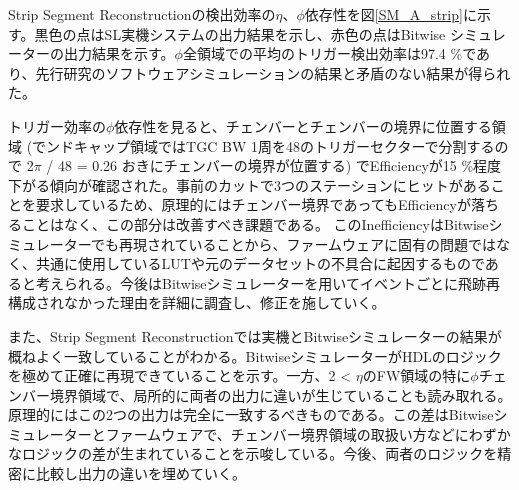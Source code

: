 Strip Segment Reconstructionの検出効率の$\eta$、$\phi$依存性を図\ref{SM_A_strip}に示す。黒色の点はSL実機システムの出力結果を示し、赤色の点はBitwise シミュレーターの出力結果を示す。$\phi$全領域での平均のトリガー検出効率は97.4 \%であり、先行研究のソフトウェアシミュレーションの結果と矛盾のない結果が得られた。

トリガー効率の$\phi$依存性を見ると、チェンバーとチェンバーの境界に位置する領域 (でンドキャップ領域ではTGC BW 1周を48のトリガーセクターで分割するので 2$\pi$ / 48 = 0.26 おきにチェンバーの境界が位置する) でEfficiencyが15 \%程度下がる傾向が確認された。事前のカットで3つのステーションにヒットがあることを要求しているため、原理的にはチェンバー境界であってもEfficiencyが落ちることはなく、この部分は改善すべき課題である。
このInefficiencyはBitwiseシミュレーターでも再現されていることから、ファームウェアに固有の問題ではなく、共通に使用しているLUTや元のデータセットの不具合に起因するものであると考えられる。今後はBitwiseシミュレーターを用いてイベントごとに飛跡再構成されなかった理由を詳細に調査し、修正を施していく。

また、Strip Segment Reconstructionでは実機とBitwiseシミュレーターの結果が概ねよく一致していることがわかる。BitwiseシミュレーターがHDLのロジックを極めて正確に再現できていることを示す。一方、2 < $\eta$のFW領域の特に$\phi$チェンバー境界領域で、局所的に両者の出力に違いが生じていることも読み取れる。原理的にはこの2つの出力は完全に一致するべきものである。この差はBitwiseシミュレーターとファームウェアで、チェンバー境界領域の取扱い方などにわずかなロジックの差が生まれていることを示唆している。今後、両者のロジックを精密に比較し出力の違いを埋めていく。

